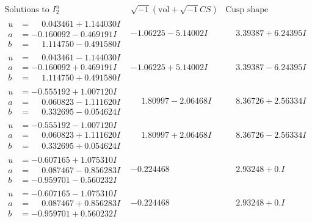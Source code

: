\documentclass[1p]{elsarticle_modified}
\theoremstyle{definition}
\newcommand{\I}{\sqrt{-1}}
\begin{document}
$$\begin{array}{c|c|c}  
\text{Solutions to }I^u_{2}& \I (\text{vol} + \sqrt{-1}CS) & \text{Cusp shape}\\
 \hline 
\begin{aligned}
u &= \phantom{-}0.043461 + 1.144030 I \\
a &= -0.160092 - 0.469191 I \\
b &= \phantom{-}1.114750 - 0.491580 I\end{aligned}
 & -1.06225 - 5.14002 I & \phantom{-}3.39387 + 6.24395 I \\ \hline\begin{aligned}
u &= \phantom{-}0.043461 - 1.144030 I \\
a &= -0.160092 + 0.469191 I \\
b &= \phantom{-}1.114750 + 0.491580 I\end{aligned}
 & -1.06225 + 5.14002 I & \phantom{-}3.39387 - 6.24395 I \\ \hline\begin{aligned}
u &= -0.555192 + 1.007120 I \\
a &= \phantom{-}0.060823 - 1.111620 I \\
b &= \phantom{-}0.332695 - 0.054624 I\end{aligned}
 & \phantom{-}1.80997 - 2.06468 I & \phantom{-}8.36726 + 2.56334 I \\ \hline\begin{aligned}
u &= -0.555192 - 1.007120 I \\
a &= \phantom{-}0.060823 + 1.111620 I \\
b &= \phantom{-}0.332695 + 0.054624 I\end{aligned}
 & \phantom{-}1.80997 + 2.06468 I & \phantom{-}8.36726 - 2.56334 I \\ \hline\begin{aligned}
u &= -0.607165 + 1.075310 I \\
a &= \phantom{-}0.087467 - 0.856283 I \\
b &= -0.959701 - 0.560232 I\end{aligned}
 & -0.224468\phantom{ +0.000000I} & \phantom{-}2.93248 + 0. I\phantom{ +0.000000I} \\ \hline\begin{aligned}
u &= -0.607165 - 1.075310 I \\
a &= \phantom{-}0.087467 + 0.856283 I \\
b &= -0.959701 + 0.560232 I\end{aligned}
 & -0.224468\phantom{ +0.000000I} & \phantom{-}2.93248 + 0. I\phantom{ +0.000000I} \\ \hline\begin{aligned}

\end{aligned}
\end{array}$$
\end{document}
